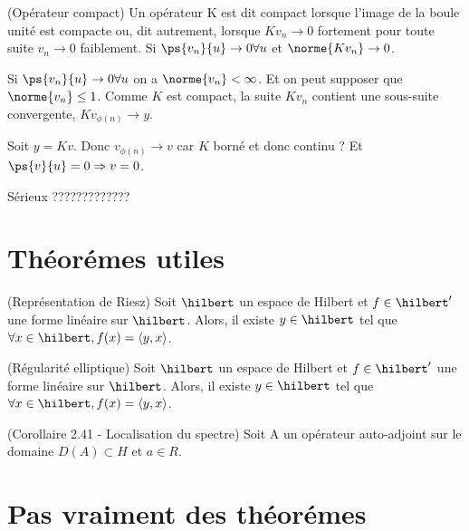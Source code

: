 \begin{defi}
    (Opérateur compact)
    Un opérateur K est dit compact lorsque l’image de la boule unité est
    compacte ou, dit autrement, lorsque $Kv_n \to 0$ fortement pour toute
    suite $v_n \to 0$ faiblement.
    Si $\ps{v_n}{u} \to 0 \forall u$ et $\norme{Kv_n} \to 0$.

    Si $\ps{v_n}{u} \to 0 \forall u$ on a $\norme{v_n} < \infty$. Et on peut
    supposer que $\norme{v_n} \leq 1$. Comme $K$ est compact, la suite $Kv_n$
    contient une sous-suite convergente, $Kv_{\phi(n)} \to y$.

    Soit $y = Kv$. Donc $v_{\phi(n)} \to v$ car $K$ borné et donc continu ?
    Et $\ps{v}{u} = 0 \Rightarrow v = 0$.

    Sérieux ?????????????

\end{defi}





\section{Théorémes utiles}

\begin{thm}
    (Représentation de Riesz)
    Soit $\hilbert$ un espace de Hilbert et $f \in \hilbert '$
    une forme linéaire sur $\hilbert$. Alors, il existe $y \in \hilbert$
    tel que $\forall x \in \hilbert, f(x) = \langle y, x \rangle$.
\end{thm}

\begin{thm}
    (Régularité elliptique)
    Soit $\hilbert$ un espace de Hilbert et $f \in \hilbert '$
    une forme linéaire sur $\hilbert$. Alors, il existe $y \in \hilbert$
    tel que $\forall x \in \hilbert, f(x) = \langle y, x \rangle$.
\end{thm}


\begin{thm}
    (Corollaire 2.41 - Localisation du spectre)
    Soit A un opérateur auto-adjoint sur le domaine $D(A)\subset H$ et
    $a \in R.$
\end{thm}







\section{Pas vraiment des théorémes}


